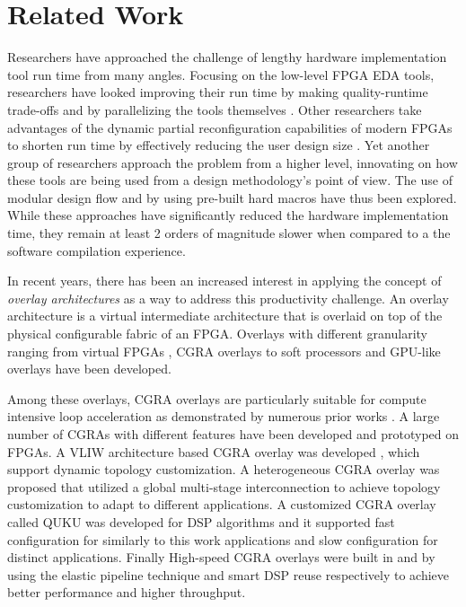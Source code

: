 \section{Related Work}\label{sec:relatedwork}
Researchers have approached the challenge of lengthy hardware implementation tool run time from many angles.  Focusing on the low-level FPGA EDA tools, researchers have looked improving their run time by making quality-runtime trade-offs \cite{mulpuri2001runtime} and by parallelizing the tools themselves \cite{moctar2014parallel, goeders2011deterministic, altera-pc, 
xilinx-pc}.
Other researchers take advantages of the dynamic partial reconfiguration capabilities of modern FPGAs to shorten run time by effectively reducing the user design size \cite{Frangieh2010}.
Yet another group of researchers approach the problem from a higher level, innovating on how these tools are being used from a design methodology's point of view.  The use of modular design flow and by using pre-built hard macros \cite{lavin2013improving, korf2011automatic} have thus been explored.
While these approaches have significantly reduced the hardware implementation time, they remain at least 2 orders of magnitude slower when compared to a the software compilation experience. 

In recent years, there has been an increased interest in applying the concept 
of \emph{overlay architectures} as a way to address this productivity challenge. 
An overlay architecture is a virtual intermediate architecture that is overlaid 
on top of the physical configurable fabric of an FPGA. Overlays with different 
granularity ranging from virtual FPGAs \cite{zuma2013carl,Grant2011Malibu,
Coole2010Intermediate,Koch2013CI}, CGRA overlays \cite{kissler2006dynamically, 
ferreira2011fpga, shukla2006quku, capalijia2013pipelined, dsp2015cgra} to soft 
processors \cite{Lebedev2010} and GPU-like overlays \cite{Jeffrey2011potential} 
have been developed. 

Among these overlays, CGRA overlays are particularly suitable for compute intensive loop acceleration as demonstrated by numerous prior works 
\cite{tessier2001reconfigurable,compton2002reconfigurable}.
A large number of CGRAs with different features have been developed and 
prototyped on FPGAs. A VLIW architecture based CGRA overlay was developed  
\cite{kissler2006dynamically}, which support dynamic topology customization. 
A heterogeneous CGRA overlay was proposed \cite{ferreira2011fpga} that utilized a global multi-stage interconnection to achieve topology customization 
to adapt to different applications. A customized CGRA overlay called 
QUKU \cite{shukla2006quku} was developed for DSP algorithms and it supported fast configuration for similarly to this work applications and slow configuration for distinct applications.
Finally High-speed CGRA overlays were built in \cite{capalijia2013pipelined} and \cite{dsp2015cgra} by using the elastic pipeline technique and smart DSP reuse respectively to achieve better performance and higher throughput.



